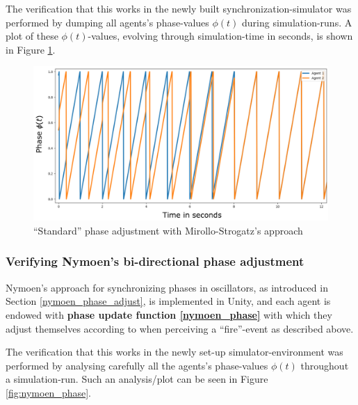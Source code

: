 		The verification that this works in the newly built synchronization-simulator was performed by dumping all agents's phase-values $\phi(t)$ during simulation-runs. A plot of these $\phi(t)$-values, evolving through simulation-time in seconds, is shown in Figure \ref{fig:strog_phase}.
		
		\begin{figure}[h]
			\centering
			\includegraphics[width=0.9\linewidth]{Assets/DocSegments/Chapters/ExperimentsAndResults/Figures/Validations/MirolloStrogatzPhaseAdjustmentSecondTry.pdf}
			\caption[Illustration of Mirollo \& Strogatz's ``standard'' phase adjustment ($Adj_{\phi}$) method.]{``Standard'' phase adjustment with Mirollo-Strogatz's approach}
			\label{fig:strog_phase}
		\end{figure}
		
		
		\subsubsection{Verifying Nymoen's bi-directional phase adjustment} %
		
		Nymoen's approach for synchronizing phases in oscillators, as introduced in Section \ref{nymoen_phase_adjust}, is implemented in Unity, and each agent is endowed with \textbf{phase update function \eqref{nymoen_phase}} with which they adjust themselves according to when perceiving a ``fire''-event as described above.
		
		The verification that this works in the newly set-up simulator-environment was performed by analysing carefully all the agents's phase-values $\phi(t)$ throughout a simulation-run. Such an analysis/plot can be seen in Figure \ref{fig:nymoen_phase}.
		
